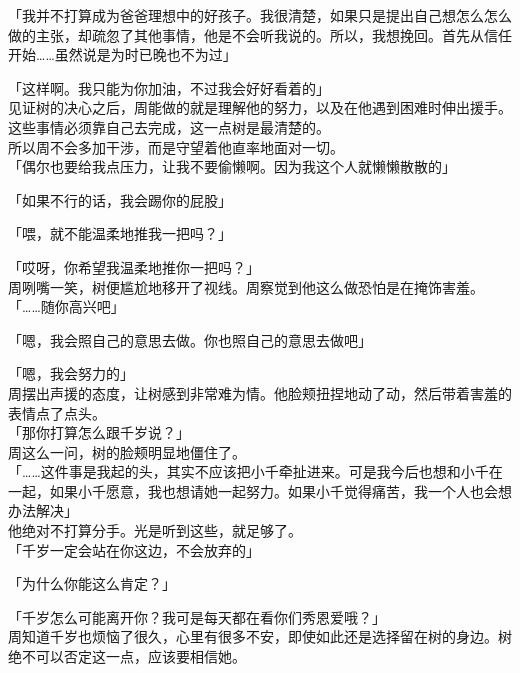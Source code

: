 「我并不打算成为爸爸理想中的好孩子。我很清楚，如果只是提出自己想怎么怎么做的主张，却疏忽了其他事情，他是不会听我说的。所以，我想挽回。首先从信任开始……虽然说是为时已晚也不为过」

「这样啊。我只能为你加油，不过我会好好看着的」\\

见证树的决心之后，周能做的就是理解他的努力，以及在他遇到困难时伸出援手。这些事情必须靠自己去完成，这一点树是最清楚的。\\

所以周不会多加干涉，而是守望着他直率地面对一切。\\

「偶尔也要给我点压力，让我不要偷懒啊。因为我这个人就懒懒散散的」

「如果不行的话，我会踢你的屁股」

「喂，就不能温柔地推我一把吗？」

「哎呀，你希望我温柔地推你一把吗？」\\

周咧嘴一笑，树便尴尬地移开了视线。周察觉到他这么做恐怕是在掩饰害羞。\\

「……随你高兴吧」

「嗯，我会照自己的意思去做。你也照自己的意思去做吧」

「嗯，我会努力的」\\

周摆出声援的态度，让树感到非常难为情。他脸颊扭捏地动了动，然后带着害羞的表情点了点头。\\

「那你打算怎么跟千岁说？」\\

周这么一问，树的脸颊明显地僵住了。\\

「……这件事是我起的头，其实不应该把小千牵扯进来。可是我今后也想和小千在一起，如果小千愿意，我也想请她一起努力。如果小千觉得痛苦，我一个人也会想办法解决」\\

他绝对不打算分手。光是听到这些，就足够了。\\

「千岁一定会站在你这边，不会放弃的」

「为什么你能这么肯定？」

「千岁怎么可能离开你？我可是每天都在看你们秀恩爱哦？」\\

周知道千岁也烦恼了很久，心里有很多不安，即使如此还是选择留在树的身边。树绝不可以否定这一点，应该要相信她。


